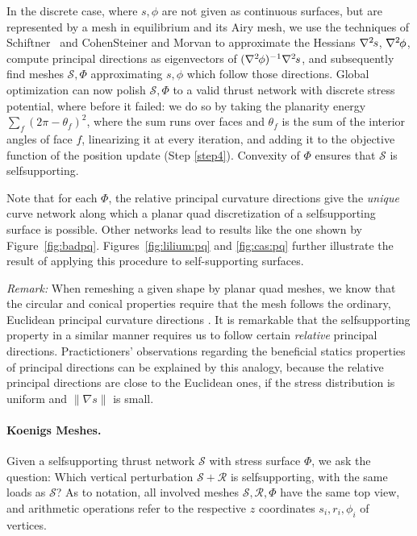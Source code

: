 \documentclass[review]{acmsiggraph}
\def\ess{s}
\def\Hess#1{{\def\testess{#1}\nabla^2\ifx\testess\ess\!s\else #1\fi}}
\def\Hess#1{\text{$\nabla^2\hskip-.2ex #1$}}
\def\SS{{\mathcal S}}
\def\RR{{\mathcal R}}
\begin{document}
In the discrete case, where $s,\phi$ are not given as continuous surfaces, 
but are represented by a mesh in equilibrium and its Airy mesh, we use the 
techniques of Schiftner~ and Cohen\dash Steiner 
and Morvan  to approximate the Hessians 
$\Hess s$, $\Hess\phi$, compute principal directions as eigenvectors of 
$(\Hess\phi)^{-1}\Hess s$, and subsequently find meshes $\SS,\Phi$ 
approximating $s,\phi$ which follow those directions. Global optimization 
can now polish $\SS,\Phi$ to a valid thrust network with discrete stress 
potential, where before it failed: we do so by taking the planarity energy
$\sum_f (2\pi - \theta_f)^2$, where the sum runs over faces and $\theta_f$ is the
sum of the interior angles of face $f$, linearizing it at every iteration, and
adding it to the objective function of the position update (Step \ref{step4}).
Convexity of $\Phi$ ensures that $\SS$ is self\dash supporting. 


Note that for each $\Phi$, the relative principal curvature directions give the 
\emph{unique} curve network along which a planar quad discretization of a 
self\dash supporting surface is possible. Other networks lead to results
like the one shown by Figure~\ref{fig:badpq}.
Figures~\ref{fig:lilium:pq} and \ref{fig:cas:pq} 
further illustrate the result of applying this procedure to 
self-supporting surfaces.




{\em Remark:} When remeshing a given shape by planar quad meshes, we know
that the circular and conical properties require that the mesh follows the
ordinary, Euclidean principal curvature directions \cite{Liu2006}. It is
remarkable that the self\dash supporting property in a similar manner
requires us to follow certain {\em relative} principal directions.
Practictioners' observations regarding the beneficial statics properties
of principal directions can be explained by this analogy, because the
relative principal directions are close to the Euclidean ones, if the
stress distribution is uniform and $\|\nabla s\|$ is small.



\paragraph{Koenigs Meshes.}

Given a self\dash supporting thrust network $\SS$ with stress surface
$\Phi$, we ask the question:
Which vertical perturbation $\SS+\RR$ is self\dash supporting, with the same
loads as $\SS$? As to notation, all involved meshes $\SS,\RR,\Phi$ have the
same top view, and arithmetic operations refer to the respective $z$
coordinates
$s_i,r_i,\phi_i$ of vertices.
\end{document}
